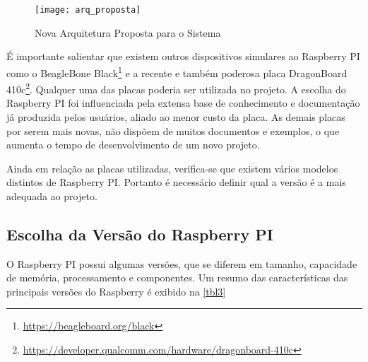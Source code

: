 		\begin{figure}[!htb]	
			\captionsetup{justification=centering}
			\begin{center}
				\texttt{[image: arq\_proposta]}  %
				\caption[Nova Arquitetura Proposta para o Sistema]{\label{fig:arq_proposta} Nova Arquitetura Proposta para o Sistema }
			\end{center}		
		\end{figure}
		
		É importante salientar que existem outros dispositivos simulares ao Raspberry PI como o BeagleBone Black\footnote{\url{https://beagleboard.org/black}} e a recente e também poderosa placa DragonBoard 410c\footnote{\url{https://developer.qualcomm.com/hardware/dragonboard-410c}}. Qualquer uma das placas poderia ser utilizada no projeto. A escolha do Raspberry PI foi influenciada pela extensa base de conhecimento e documentação já produzida pelos usuários, aliado ao menor custo da placa.  As demais placas por serem mais novas, não dispõem de muitos documentos e exemplos, o que aumenta o tempo de desenvolvimento de um novo projeto.
		
		Ainda em relação as placas utilizadas, verifica-se que existem vários modelos distintos de Raspberry PI. Portanto é necessário definir qual a versão é a mais adequada ao projeto.
		
		\subsection{Escolha da Versão do Raspberry PI}
			O Raspberry PI possui algumas versões, que se diferem em tamanho, capacidade de memória, processamento e componentes. Um resumo das características das principais versões do Raspberry é exibido na \autoref{tbl3}
			
